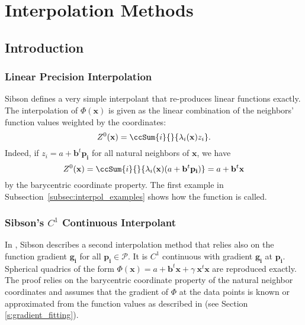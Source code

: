\section{Interpolation Methods\label{sec:interpolation}}
\subsection{Introduction}
\subsubsection{Linear Precision Interpolation}

Sibson \cite{s-bdnni-81} defines a very simple interpolant that
re-produces linear functions exactly. The interpolation of
$\Phi(\mathbf{x})$ is given as the linear combination of the neighbors' function
values weighted by the coordinates:
\begin{displaymath}
  Z^0(\mathbf{x}) = \ccSum{i}{}{ \lambda_i(\mathbf{x}) z_i}.
\end{displaymath}
Indeed, if $z_i=a + \mathbf{b}^t \mathbf{p_i}$ for all natural
neighbors of $\mathbf{x}$, we have
\[  Z^0(\mathbf{x}) = \ccSum{i}{}{ \lambda_i(\mathbf{x}) (a + \mathbf{b}^t\mathbf{p_i})} = a+\mathbf{b}^t \mathbf{x}\]
by the barycentric coordinate property. The first example in
Subsection~\ref{subsec:interpol_examples} shows how the function is
called.

\subsubsection{Sibson's $C^1$ Continuous Interpolant}
In \cite{s-bdnni-81}, Sibson describes a second interpolation method
that relies also on the function gradient $\mathbf{g_i}$ for all $\mathbf{p_i} \in \mathcal{P}$. It is $C^1$ continuous with gradient $\mathbf{g_i}$ at
$\mathbf{p_i}$. Spherical quadrics of the form $\Phi(\mathbf{x}) =a +
\mathbf{b}^t \mathbf{x} +\gamma\ \mathbf{x}^t\mathbf{x}$ are reproduced 
exactly. The
proof relies on the barycentric coordinate property of the natural
neighbor coordinates and assumes that the gradient of $\Phi$ at the
data points is known or approximated from the function values as
described in \cite{s-bdnni-81} (see Section \ref{s:gradient_fitting}). 

